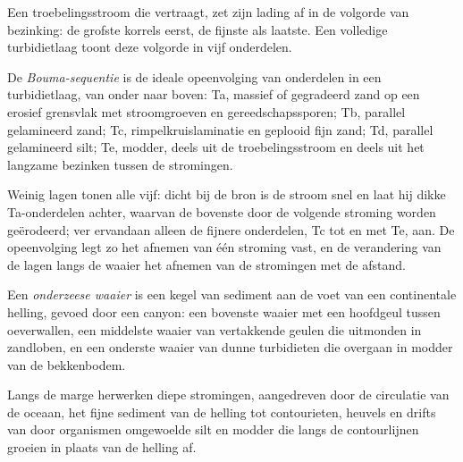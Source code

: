Een troebelingsstroom die vertraagt, zet zijn lading af in de volgorde van bezinking:
de grofste korrels eerst, de fijnste als laatste. Een volledige turbidietlaag toont
deze volgorde in vijf onderdelen.

\begin{definition}\label{def:b3:facies-models:bouma}
De \emph{Bouma-sequentie} is de ideale opeenvolging van
onderdelen in een turbidietlaag, van onder naar boven: Ta, massief of gegradeerd zand op
een erosief grensvlak met stroomgroeven en gereedschapssporen; Tb, parallel gelamineerd zand; Tc,
rimpelkruislaminatie en geplooid fijn zand; Td, parallel gelamineerd silt;
Te, modder, deels uit de troebelingsstroom en deels uit het langzame bezinken
tussen de stromingen.
\end{definition}

Weinig lagen tonen alle vijf: dicht bij de bron is de stroom snel en laat hij dikke
Ta-onderdelen achter, waarvan de bovenste door de volgende stroming worden geërodeerd; ver ervandaan alleen
de fijnere onderdelen, Tc tot en met Te, aan. De opeenvolging legt zo het
afnemen van één stroming vast, en de verandering van de lagen langs de waaier het
afnemen van de stromingen met de afstand.

\begin{definition}\label{def:b3:facies-models:fan}
Een \emph{onderzeese waaier} is een kegel van sediment aan de voet
van een continentale helling, gevoed door een canyon: een bovenste waaier met een hoofdgeul
tussen oeverwallen, een middelste waaier van vertakkende geulen die uitmonden in zandloben,
en een onderste waaier van dunne turbidieten die overgaan in modder van de bekkenbodem.
\end{definition}

Langs de marge herwerken diepe stromingen, aangedreven door de circulatie van de oceaan, het
fijne sediment van de helling tot contourieten, heuvels en drifts van
door organismen omgewoelde silt en modder die langs de contourlijnen groeien in plaats van de
helling af.

